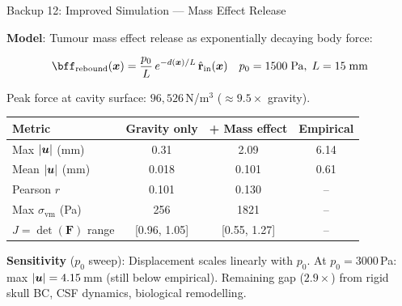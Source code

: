\begin{frame}{Backup 12: Improved Simulation --- Mass Effect Release}

  \small

  \textbf{Model}: Tumour mass effect release as exponentially decaying body force:

  \[
    \bff_{\text{rebound}}(\bfx)
    = \frac{p_0}{L}\,e^{-d(\bfx)/L}\,\hat{\mathbf{r}}_{\text{in}}(\bfx)
    \quad
    p_0 = 1500\;\text{Pa},\;L=15\;\text{mm}
  \]

  Peak force at cavity surface: $96{,}526$\,N/m$^3$ ($\approx 9.5\times$ gravity).

  \medskip

  \begin{tabular}{lccc}
    \toprule
    \textbf{Metric} & \textbf{Gravity only} & \textbf{+ Mass effect} & \textbf{Empirical} \\
    \midrule
    Max $|\bm{u}|$ (mm) & 0.31 & \alert{2.09} & 6.14 \\
    Mean $|\bm{u}|$ (mm) & 0.018 & \alert{0.101} & 0.61 \\
    Pearson $r$ & 0.101 & \alert{0.130} & -- \\
    Max $\sigma_{\text{vm}}$ (Pa) & 256 & 1821 & -- \\
    $J = \det(\mathbf{F})$ range & [0.96, 1.05] & [0.55, 1.27] & -- \\
    \bottomrule
  \end{tabular}

  \bigskip

  \textbf{Sensitivity} ($p_0$ sweep):
  Displacement scales linearly with $p_0$.
  At $p_0 = 3000$\,Pa: max $|\bm{u}| = 4.15$\,mm (still below empirical).
  Remaining gap ($2.9\times$) from rigid skull BC, CSF dynamics,
  biological remodelling.

\end{frame}

